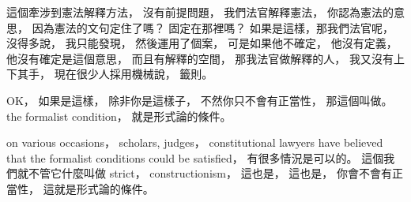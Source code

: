 \hypertarget{w02:cue:2209}{}這個牽涉到憲法解釋方法，
\hypertarget{w02:cue:2210}{}沒有前提問題，
\hypertarget{w02:cue:2211}{}我們法官解釋憲法，
\hypertarget{w02:cue:2212}{}你認為憲法的意思，
\hypertarget{w02:cue:2213}{}因為憲法的文句定住了嗎？
\hypertarget{w02:cue:2214}{}固定在那裡嗎？
\hypertarget{w02:cue:2215}{}如果是這樣，那我們法官呢，
\hypertarget{w02:cue:2216}{}沒得多說，
\hypertarget{w02:cue:2217}{}我只能發現，
\hypertarget{w02:cue:2218}{}然後運用了個案，
\hypertarget{w02:cue:2219}{}可是如果他不確定，
\hypertarget{w02:cue:2220}{}他沒有定義，
\hypertarget{w02:cue:2221}{}他沒有確定是這個意思，
\hypertarget{w02:cue:2222}{}而且有解釋的空間，
\hypertarget{w02:cue:2223}{}那我法官做解釋的人，
\hypertarget{w02:cue:2224}{}我又沒有上下其手，
\hypertarget{w02:cue:2225}{}現在很少人採用機械說，
\hypertarget{w02:cue:2226}{}籤則。

\hypertarget{w02:cue:2227}{}OK，
\hypertarget{w02:cue:2228}{}如果是這樣，
\hypertarget{w02:cue:2229}{}除非你是這樣子，
\hypertarget{w02:cue:2230}{}不然你只不會有正當性，
\hypertarget{w02:cue:2231}{}那這個叫做。
\hypertarget{w02:cue:2232}{}the formalist condition，
\hypertarget{w02:cue:2233}{}就是形式論的條件。

\hypertarget{w02:cue:2234}{}on various occasions，
\hypertarget{w02:cue:2235}{}scholars, judges，
\hypertarget{w02:cue:2236}{}constitutional lawyers have believed that the formalist conditions could be satisfied，
\hypertarget{w02:cue:2237}{}有很多情況是可以的。
\hypertarget{w02:cue:2238}{}這個我們就不管它什麼叫做 strict，
\hypertarget{w02:cue:2239}{}constructionism，
\hypertarget{w02:cue:2240}{}這也是，
\hypertarget{w02:cue:2241}{}這也是，
\hypertarget{w02:cue:2242}{}你會不會有正當性，
\hypertarget{w02:cue:2243}{}這就是形式論的條件。

